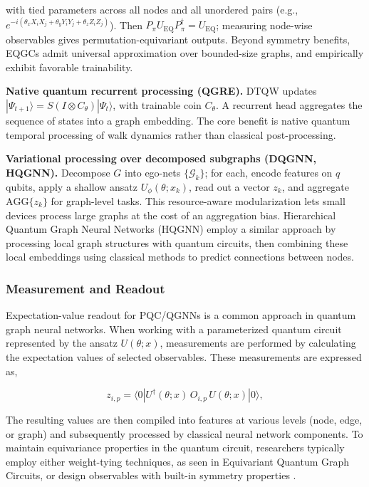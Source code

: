 \documentclass[11pt]{article}
\begin{document}
with tied parameters across all nodes and all unordered pairs (e.g., $e^{-i(\theta_x X_iX_j+\theta_y Y_iY_j+\theta_z Z_iZ_j)}$). Then $P_\pi U_{\text{EQ}}P_\pi^\dagger=U_{\text{EQ}}$; measuring node-wise observables gives permutation-equivariant outputs. Beyond symmetry benefits, EQGCs admit universal approximation over bounded-size graphs, and empirically exhibit favorable trainability.

\noindent \textbf{Native quantum recurrent processing (QGRE).} \citep{dernbach2019qw_feature_coin} DTQW updates $|\Psi_{t+1}\rangle= S(I\!\otimes\!C_\theta)|\Psi_t\rangle$, with trainable coin $C_\theta$. A recurrent head aggregates the sequence of states into a graph embedding. The core benefit is native quantum temporal processing of walk dynamics rather than classical post-processing.

\noindent \textbf{Variational processing over decomposed subgraphs (DQGNN, HQGNN).}\citep{verdon2019qgnn, ai2022towards}
Decompose $G$ into ego-nets $\{\mathcal{G}_k\}$; for each, encode features on $q$ qubits, apply a shallow ansatz $U_\phi(\theta;x_k)$, read out a vector $z_k$, and aggregate $\mathrm{AGG}\{z_k\}$ for graph-level tasks. This resource-aware modularization lets small devices process large graphs at the cost of an aggregation bias. Hierarchical Quantum Graph Neural Networks (HQGNN) employ a similar approach by processing local graph structures with quantum circuits, then combining these local embeddings using classical methods to predict connections between nodes.

\subsubsection*{Measurement and Readout}

Expectation-value readout for PQC/QGNNs is a common approach in quantum graph neural networks. When working with a parameterized quantum circuit represented by the ansatz $U(\theta;x)$, measurements are performed by calculating the expectation values of selected observables. These measurements are expressed as,

$$
z_{i,p}=\langle 0|U^\dagger(\theta;x)\,O_{i,p}\,U(\theta;x)|0\rangle,
$$

The resulting values are then compiled into features at various levels (node, edge, or graph) and subsequently processed by classical neural network components. To maintain equivariance properties in the quantum circuit, researchers typically employ either weight-tying techniques, as seen in Equivariant Quantum Graph Circuits, or design observables with built-in symmetry properties \citep{mernyei2021eqgc}.
\end{document}
